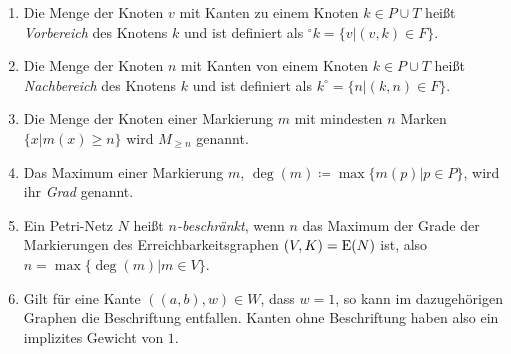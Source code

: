 \begin{enumerate}
	\item Die Menge der Knoten $v$ mit Kanten zu einem Knoten $k \in P\cup T$ heißt \emph{Vorbereich} des Knotens $k$ und ist definiert als $^\circ k = \{v | (v,k) \in F\}$.
	\item Die Menge der Knoten $n$ mit Kanten von einem Knoten $k \in P\cup T$ heißt \emph{Nachbereich} des Knotens $k$ und ist definiert als $k^\circ  = \{n | (k,n) \in F\}$.
	\item Die Menge der Knoten einer Markierung $m$ mit mindesten $n$ Marken $\{x | m(x)\geq n\}$ wird $M_{\geq n}$ genannt.
	\item Das Maximum einer Markierung $m$, $\deg(m) \coloneqq \max \{m(p)|p\in P\}$, wird ihr \emph{Grad} genannt.
	\item Ein Petri-Netz $N$ heißt \emph{$n$-beschränkt}, wenn $n$ das Maximum der Grade der Markierungen des Erreichbarkeitsgraphen $(V,K)=\operatorname{E}(N)$ ist, also $n = \max\{\deg(m)| m\in V \}$.
	\item Gilt für eine Kante $((a, b),w) \in W$, dass $w = 1$, so kann im dazugehörigen Graphen die Beschriftung entfallen. Kanten ohne Beschriftung haben also ein implizites Gewicht von $1$.
\end{enumerate}



